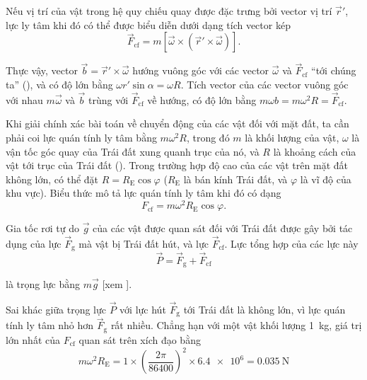 \begin{figure}[!htb]
\begin{minipage}[t]{0.5\linewidth}
\begin{center}
			\caption[]{}
			\label{fig:4_5}
		\end{center}
	\end{minipage}
\end{figure}

Nếu vị trí của vật trong hệ quy chiếu quay được đặc trưng bởi vector vị trí $\vec{r}'$, lực ly tâm khi đó có thể được biểu diễn dưới dạng tích vector kép
\begin{equation}\label{eq:4_6}
\vec{F}_{\text{cf}} = m [\vec{\omega} \times (\vec{r}'\times\vec{\omega})].
\end{equation}

\noindent
Thực vậy, vector $\vec{b}=\vec{r}'\times\vec{\omega}$ hướng vuông góc với các vector $\vec{\omega}$ và $\vec{F}_{\text{cf}}$ ``tới chúng ta'' (), và có độ lớn bằng $\omega r'\sin\alpha=\omega R$. Tích vector của các vector vuông góc với nhau $m\vec{\omega}$ và $\vec{b}$ trùng với $\vec{F}_{\text{cf}}$ về hướng, có độ lớn bằng $m\omega b=m\omega^2R=\vec{F}_{\text{cf}}$.

Khi giải chính xác bài toán về chuyển động của các vật đối với mặt đất, ta cần phải coi lực quán tính ly tâm bằng $m\omega^2R$, trong đó $m$ là khối lượng của vật, $\omega$ là vận tốc góc quay của Trái đất xung quanh trục của nó, và $R$ là khoảng cách của vật tới trục của Trái đất (). Trong trường hợp độ cao của các vật trên mặt đất không lớn, có thể đặt $R=R_{\text{E}}\cos\varphi$ ($R_{\text{E}}$ là bán kính Trái đất, và $\varphi$ là vĩ độ của khu vực). Biểu thức mô tả lực quán tính ly tâm khi đó có dạng
\begin{equation}\label{eq:4_7}
F_{\text{cf}} = m\omega^2 R_{\text{E}}\cos\varphi.
\end{equation}

Gia tốc rơi tự do $\vec{g}$ của các vật được quan sát đối với Trái đất được gây bởi tác dụng của lực $\vec{F}_{\text{g}}$ mà vật bị Trái đất hút, và lực $\vec{F}_{\text{cf}}$. Lực tổng hợp của các lực này
\begin{equation}\label{eq:4_8}
\vec{P} = \vec{F}_{\text{g}} + \vec{F}_{\text{cf}}
\end{equation}

\noindent
là trọng lực bằng $m\vec{g}$ [xem ].

Sai khác giữa trọng lực $\vec{P}$ với lực hút $\vec{F}_{\text{g}}$ tới Trái đất là không lớn, vì lực quán tính ly tâm nhỏ hơn $\vec{F}_{\text{g}}$ rất nhiều. Chẳng hạn với một vật khối lượng \SI{1}{\kilo\gram}, giá trị lớn nhất của $F_{\text{cf}}$ quan sát trên xích đạo bằng
\begin{equation*}
m\omega^2 R_{\text{E}} = 1 \times \left(\frac{2\pi}{86400}\right)^2 \times \num{6.4e6} = \SI{0.035}{\newton}
\end{equation*}

